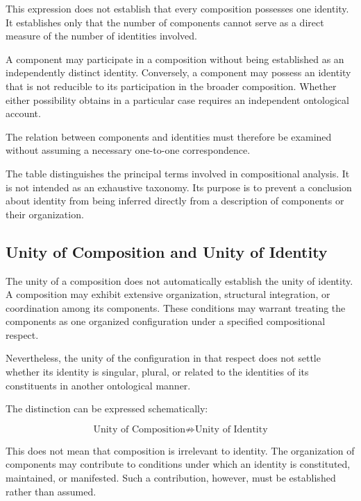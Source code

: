 This expression does not establish that every composition
possesses one identity. It establishes only that the
number of components cannot serve as a direct measure
of the number of identities involved.

A component may participate in a composition without
being established as an independently distinct identity.
Conversely, a component may possess an identity that is
not reducible to its participation in the broader composition.
Whether either possibility obtains in a particular case
requires an independent ontological account.

The relation between components and identities must
therefore be examined without assuming a necessary
one-to-one correspondence.



The table distinguishes the principal terms involved
in compositional analysis. It is not intended as an
exhaustive taxonomy. Its purpose is to prevent a conclusion
about identity from being inferred directly from a
description of components or their organization.

\subsection{Unity of Composition and Unity of Identity}

The unity of a composition does not automatically
establish the unity of identity. A composition may
exhibit extensive organization, structural integration,
or coordination among its components. These conditions
may warrant treating the components as one organized
configuration under a specified compositional respect.

Nevertheless, the unity of the configuration in that
respect does not settle whether its identity is singular,
plural, or related to the identities of its constituents
in another ontological manner.

The distinction can be expressed schematically:

\[
\text{Unity of Composition}
\not\Rightarrow
\text{Unity of Identity}
\]

This does not mean that composition is irrelevant to
identity. The organization of components may contribute
to conditions under which an identity is constituted,
maintained, or manifested. Such a contribution, however,
must be established rather than assumed.


